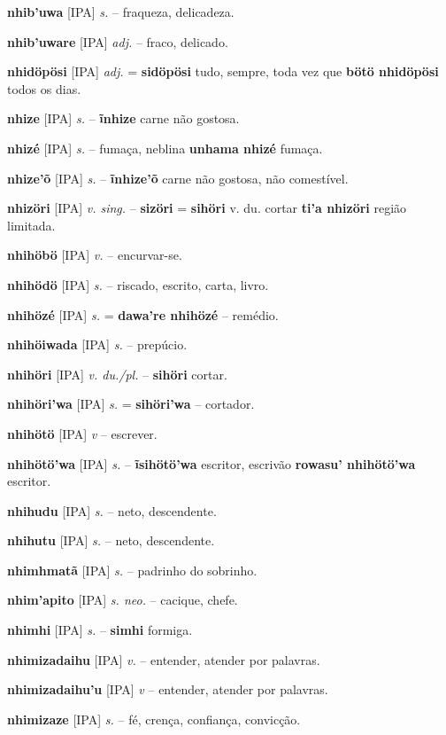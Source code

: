 \textbf{nhib'uwa} [IPA] \textit{s.} -- fraqueza, delicadeza.

\textbf{nhib'uware} [IPA] \textit{adj.} -- fraco, delicado.

\textbf{nhidöpösi} [IPA] \textit{adj.} = \textbf{sidöpösi} tudo, sempre, toda vez que  \textbf{bötö nhidöpösi} todos os dias.

\textbf{nhize} [IPA] \textit{s.} -- \textbf{ĩnhize} carne não gostosa.

\textbf{nhizé} [IPA] \textit{s.} -- fumaça, neblina  \textbf{unhama nhizé} fumaça.

\textbf{nhize'õ} [IPA] \textit{s.} -- \textbf{ĩnhize'õ} carne não gostosa, não comestível.

\textbf{nhizöri} [IPA] \textit{v. sing.} -- \textbf{sizöri} = \textbf{sihöri} v. du. cortar  \textbf{ti'a nhizöri} região limitada.

\textbf{nhihöbö} [IPA] \textit{v.} -- encurvar-se.

\textbf{nhihödö} [IPA] \textit{s.} -- riscado, escrito, carta, livro.

\textbf{nhihözé} [IPA] \textit{s.} = \textbf{dawa're nhihözé} -- remédio.

\textbf{nhihöiwada} [IPA] \textit{s.} -- prepúcio.

\textbf{nhihöri} [IPA] \textit{v. du./pl.} -- \textbf{sihöri} cortar.

\textbf{nhihöri'wa} [IPA] \textit{s.} = \textbf{sihöri'wa} -- cortador.

\textbf{nhihötö} [IPA] \textit{v} -- escrever.

\textbf{nhihötö'wa} [IPA] \textit{s.} -- \textbf{ĩsihötö'wa} escritor, escrivão  \textbf{rowasu' nhihötö'wa} escritor.

\textbf{nhihudu} [IPA] \textit{s.} -- neto, descendente.

\textbf{nhihutu} [IPA] \textit{s.} -- neto, descendente.

\textbf{nhimhmatã} [IPA] \textit{s.} -- padrinho do sobrinho.

\textbf{nhim'apito} [IPA] \textit{s. neo.} -- cacique, chefe.

\textbf{nhimhi} [IPA] \textit{s.} -- \textbf{simhi} formiga.

\textbf{nhimizadaihu} [IPA] \textit{v.} -- entender, atender por palavras.

\textbf{nhimizadaihu'u} [IPA] \textit{v} -- entender, atender por palavras.

\textbf{nhimizaze} [IPA] \textit{s.} -- fé, crença, confiança, convicção.

